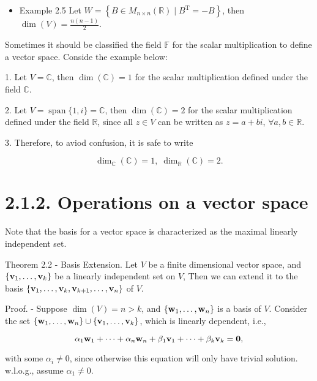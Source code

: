 \documentclass[11pt]{article}
\begin{document}
\begin{itemize}
\item Example 2.5 Let \(W = \left\{  {B \in  {M}_{n \times  n}\left( \mathbb{R}\right)  \mid  {B}^{\mathrm{T}} =  - B}\right\}\), then \(\dim \left( V\right)  = \frac{n\left( {n - 1}\right) }2\).
\end{itemize}

Sometimes it should be classified the field \(\mathbb{F}\) for the scalar multiplication to define a vector space. Conside the example below:

1. Let \(V = \mathbb{C}\), then \(\dim \left( \mathbb{C}\right)  = 1\) for the scalar multiplication defined under the field \(\mathbb{C}\).

2. Let \(V = \operatorname{span}\{ 1,i\}  = \mathbb{C}\), then \(\dim \left( \mathbb{C}\right)  = 2\) for the scalar multiplication defined under the field \(\mathbb{R}\), since all \(z \in  V\) can be written as \(z = a + {bi}\), \(\forall a,b \in  \mathbb{R}\).

3. Therefore, to aviod confusion, it is safe to write

\[
{\dim }_{\mathbb{C}}\left( \mathbb{C}\right)  = 1,\;{\dim }_{\mathbb{R}}\left( \mathbb{C}\right)  = 2.
\]

\section*{2.1.2. Operations on a vector space}

Note that the basis for a vector space is characterized as the maximal linearly independent set.

Theorem 2.2 - Basis Extension. Let \(V\) be a finite dimensional vector space, and \(\left\{  {{\bf v}_1,\ldots ,{\bf v}_{k}}\right\}\) be a linearly independent set on \(V\), Then we can extend it to the basis \(\left\{  {{\bf v}_1,\ldots ,{\bf v}_{k},{\bf v}_{k + 1},\ldots ,{\bf v}_n}\right\}\) of \(V\).

Proof. - Suppose \(\dim \left( V\right)  = n > k\), and \(\left\{  {{\bf w}_1,\ldots ,{\bf w}_n}\right\}\) is a basis of \(V\). Consider the set \(\left\{  {{\bf w}_1,\ldots ,{\bf w}_n}\right\}   \cup  \left\{  {{\bf v}_1,\ldots ,{\bf v}_{k}}\right\}\), which is linearly dependent, i.e.,

\[
\alpha_1{\bf w}_1 + \cdots  + \alpha_n{\bf w}_n + \beta_1{\bf v}_1 + \cdots  + \beta_{k}{\bf v}_{k} = \mathbf{0},
\]

with some \(\alpha_{i} \neq  0\), since otherwise this equation will only have trivial solution. w.l.o.g., assume \(\alpha_1 \neq  0\).
\end{document}
